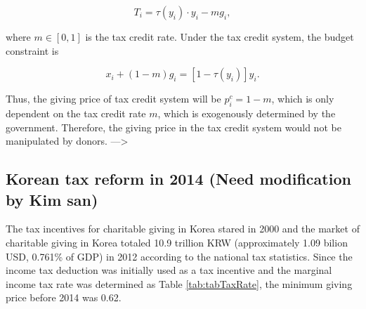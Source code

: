 \documentclass[ review  , 3p ]{elsarticle}
\begin{document}
  \[
      T_i = \tau(y_i)\cdot y_i - m g_i,
  \]

  where \(m \in [0, 1]\) is the tax credit rate. Under the tax credit system, the budget constraint is

  \[
      x_i + (1 - m) g_i = [1 - \tau(y_i)] y_i.
  \]

  Thus, the giving price of tax credit system will be \(p_i^c = 1 - m\), which is only dependent on the tax credit rate \(m\), which is exogenously determined by the government.
  Therefore, the giving price in the tax credit system would not be manipulated by donors.
  ---\textgreater{}

  \hypertarget{korean-tax-reform-in-2014-need-modification-by-kim-san}{%
  \subsection{Korean tax reform in 2014 (Need modification by Kim san)}\label{korean-tax-reform-in-2014-need-modification-by-kim-san}}

  The tax incentives for charitable giving in Korea stared in 2000 and the market of charitable giving in Korea totaled 10.9 trillion KRW (approximately 1.09 bilion USD, 0.761\% of GDP) in 2012 according to the national tax statistics.
  Since the income tax deduction was initially used as a tax incentive and the marginal income tax rate was determined as Table \ref{tab:tabTaxRate}, the minimum giving price before 2014 was 0.62.
\end{document}
